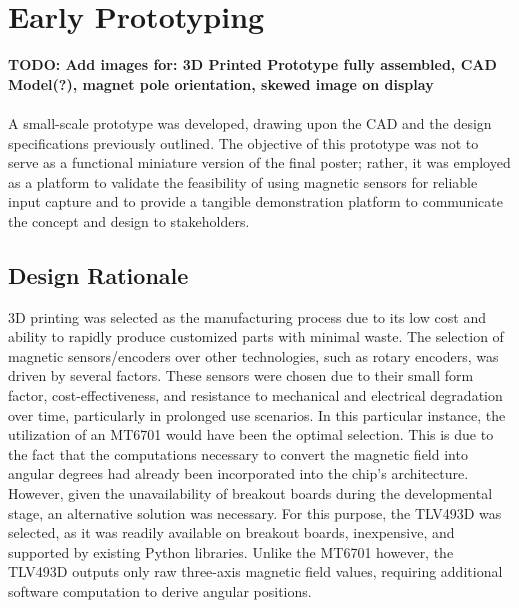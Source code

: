 \section{Early Prototyping}

\textbf{TODO: Add images for: 3D Printed Prototype fully assembled, CAD Model(?), magnet pole orientation, skewed image on display}\\\\

	A small-scale prototype was developed, drawing upon the CAD and the design specifications previously outlined. The objective of this prototype was not to serve as a functional miniature version of the final poster; rather, it was employed as a platform to validate the feasibility of using magnetic sensors for reliable input capture and to provide a tangible demonstration platform to communicate the concept and design to stakeholders.
	
	\subsection{Design Rationale}
	3D printing was selected as the manufacturing process due to its low cost and ability to rapidly produce customized parts with minimal waste.
	The selection of magnetic sensors/encoders over other technologies, such as rotary encoders, was driven by several factors. These sensors were chosen due to their small form factor, cost-effectiveness, and resistance to mechanical and electrical degradation over time, particularly in prolonged use scenarios. In this particular instance, the utilization of an MT6701 would have been the optimal selection. This is due to the fact that the computations necessary to convert the magnetic field into angular degrees had already been incorporated into the chip's architecture. However, given the unavailability of breakout boards during the developmental stage, an alternative solution was necessary. For this purpose, the TLV493D was selected, as it was readily available on breakout boards, inexpensive, and supported by existing Python libraries. Unlike the MT6701 however, the TLV493D outputs only raw three-axis magnetic field values, requiring additional software computation to derive angular positions.
	
